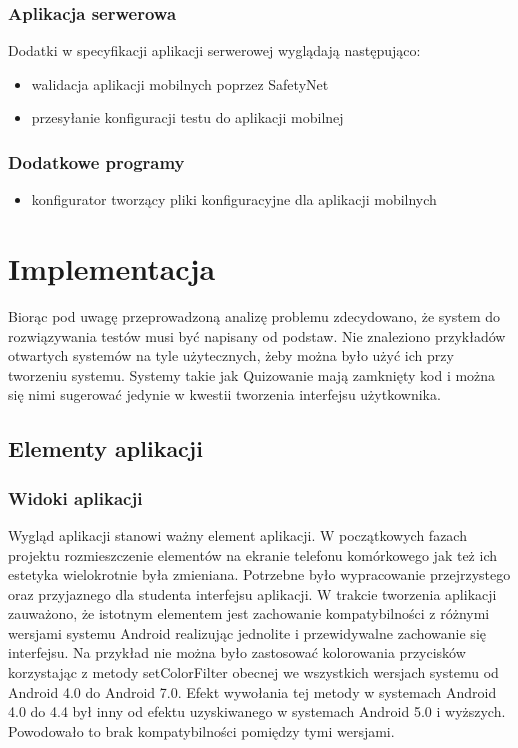 \documentclass{report}
\begin{document}
			\subsection{Aplikacja serwerowa}
			Dodatki w specyfikacji aplikacji serwerowej wyglądają następująco:
			\begin{itemize}
				\item walidacja aplikacji mobilnych poprzez SafetyNet
				\item przesyłanie konfiguracji testu do aplikacji mobilnej
			\end{itemize}
		
			\subsection{Dodatkowe programy}
			\begin{itemize}
				\item konfigurator tworzący pliki konfiguracyjne dla aplikacji mobilnych
			\end{itemize}
	
	\chapter{Implementacja}
	
	Biorąc pod uwagę przeprowadzoną analizę problemu zdecydowano, że system do rozwiązywania testów musi być napisany od podstaw. Nie znaleziono przykładów otwartych systemów na tyle użytecznych, żeby można było użyć ich przy tworzeniu systemu. Systemy takie jak Quizowanie mają zamknięty kod i można się nimi sugerować jedynie w kwestii tworzenia interfejsu użytkownika.
	
		\section{Elementy aplikacji}
	
			\subsection{Widoki aplikacji}
		
			Wygląd aplikacji stanowi ważny element aplikacji. W początkowych fazach projektu rozmieszczenie elementów na ekranie telefonu komórkowego jak też ich estetyka wielokrotnie była zmieniana. Potrzebne było wypracowanie przejrzystego oraz przyjaznego dla studenta interfejsu aplikacji. W trakcie tworzenia aplikacji zauważono, że istotnym elementem jest zachowanie kompatybilności z różnymi wersjami systemu Android realizując jednolite i przewidywalne zachowanie się interfejsu.
			Na przykład nie można było zastosować kolorowania przycisków korzystając z metody setColorFilter obecnej we wszystkich wersjach systemu od Android 4.0 do Android 7.0. Efekt wywołania tej metody w systemach Android 4.0 do 4.4 był inny od efektu uzyskiwanego w systemach Android 5.0 i wyższych. Powodowało to brak kompatybilności pomiędzy tymi wersjami.\\
		
\end{document}
